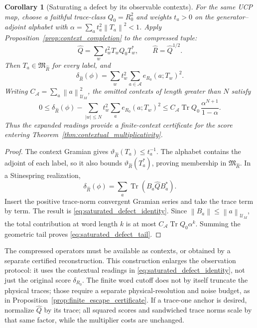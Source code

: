 \documentclass[11pt,a4paper]{amsart}
\numberwithin{equation}{section}
\newtheorem{corollary}[theorem]{Corollary}
\theoremstyle{definition}
\theoremstyle{remark}
\DeclareMathOperator{\Tr}{Tr}
\newcommand{\norm}[1]{\left\lVert#1\right\rVert}
\begin{document}
\begin{corollary}[Saturating a defect by its observable contexts]\label{cor:saturated_defect}
For the same UCP map, choose a faithful trace-class $Q_0=R_0^2$ and weights $t_a>0$ on the generator--adjoint alphabet with
$\alpha=\sum_at_a^2\norm{T_a}^2<1$.
Apply Proposition~\ref{prop:context_completion} to the compressed tuple:
\[
 \widehat Q=\sum_wt_w^2T_wQ_0T_w^*,\qquad
 \widehat R=\widehat Q^{1/2}.
\]
Then $T_a\in\mathfrak M_{\widehat R}$ for every label, and
\begin{equation}\label{eq:saturated_defect_identity}
 \delta_{\widehat R}(\phi)
 =\sum_wt_w^2\sum_{a\in\mathcal A}e_{R_0}(a;T_w)^2.
\end{equation}
Writing $C_{\mathcal A}=\sum_a\norm{a}_{\mathcal U_M}^2$, the omitted contexts of length greater than $N$ satisfy
\begin{equation}\label{eq:saturated_defect_tail}
 0\le\delta_{\widehat R}(\phi)
 -\sum_{|w|\le N}t_w^2\sum_a e_{R_0}(a;T_w)^2
 \le C_{\mathcal A}\Tr Q_0\,
          \frac{\alpha^{N+1}}{1-\alpha}.
\end{equation}
Thus the expanded readings provide a finite-context certificate for the score entering Theorem~\ref{thm:contextual_multiplicativity}.
\end{corollary}
\begin{proof}
The context Gramian gives $\vartheta_{\widehat R}(T_a)\le t_a^{-1}$. The alphabet contains the adjoint of each label, so it also bounds $\vartheta_{\widehat R}(T_a^*)$, proving membership in $\mathfrak M_{\widehat R}$. In a Stinespring realization,
\[
 \delta_{\widehat R}(\phi)=\sum_a\Tr(B_a\widehat QB_a^*).
\]
Insert the positive trace-norm convergent Gramian series and take the trace term by term. The result is \eqref{eq:saturated_defect_identity}. Since $\norm{B_a}\le\norm{a}_{\mathcal U_M}$, the total contribution at word length $k$ is at most $C_{\mathcal A}\Tr Q_0\alpha^k$. Summing the geometric tail proves \eqref{eq:saturated_defect_tail}.
\end{proof}

The compressed operators must be available as contexts, or obtained by a separate certified reconstruction. This construction enlarges the observation protocol: it uses the contextual readings in \eqref{eq:saturated_defect_identity}, not just the original score $\delta_{R_0}$. The finite word cutoff does not by itself truncate the physical traces; those require a separate physical-resolution and noise budget, as in Proposition~\ref{prop:finite_escape_certificate}. If a trace-one anchor is desired, normalize $\widehat Q$ by its trace; all squared scores and sandwiched trace norms scale by that same factor, while the multiplier costs are unchanged.
\end{document}

